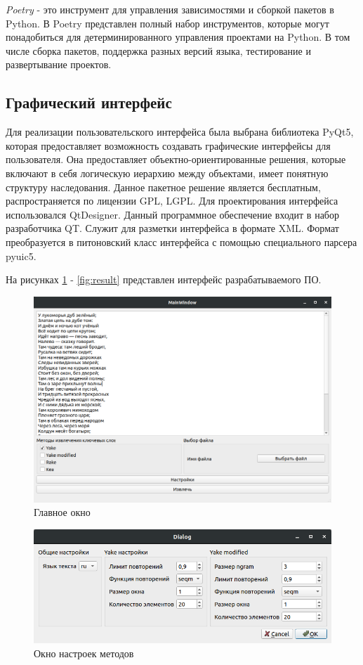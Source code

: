\textit{Poetry} - это инструмент для управления зависимостями и сборкой пакетов в Python.
В Poetry представлен полный набор инструментов, которые могут понадобиться для детерминированного управления проектами на Python. В том числе сборка пакетов, поддержка разных версий языка, тестирование и развертывание проектов.

\subsection{Графический интерфейс}
Для реализации пользовательского интерфейса была выбрана библиотека PyQt5, которая предоставляет возможность создавать графические интерфейсы для пользователя. 
Она предоставляет объектно-ориентированные решения, которые включают в себя логическую иерархию между объектами, имеет понятную структуру наследования.
Данное пакетное решение является бесплатным, распространяется по лицензии GPL, LGPL.
Для проектирования интерфейса использовался QtDesigner.
Данный программное обеспечение  входит в набор разработчика QT.
Служит для разметки интерфейса в формате XML.
Формат преобразуется в питоновский класс интерфейса с помощью специального парсера pyuic5.

На рисунках \ref{fig:1} - \ref{fig:result} представлен интерфейс разрабатываемого ПО.

\begin{figure}[!h]
	\centering
	\includegraphics[width=1\linewidth]{src/img/programm/1}
	\caption{Главное окно}
	\label{fig:1}
\end{figure}

\begin{figure}[!h]
	\centering
	\includegraphics[width=1\linewidth]{src/img/programm/settings}
	\caption{Окно настроек методов}
	\label{fig:settings}
\end{figure}

